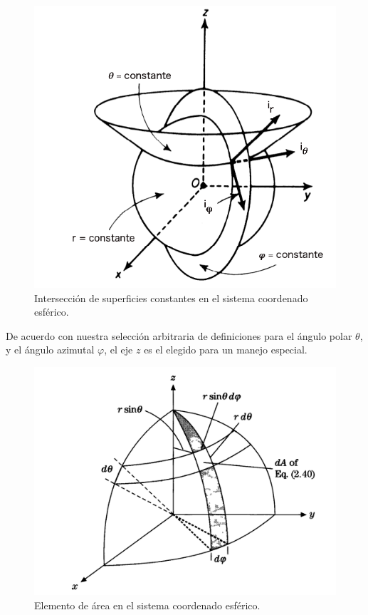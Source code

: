 \begin{figure}
    \centering
    \includegraphics[scale=0.5]{Imagenes/CoordenadasEsfericasSuperficiesConstantes.png}
    \caption{Intersección de superficies constantes en el sistema coordenado esférico.}
    \label{fig:figura_coordenadas_esfericas_superficies}
\end{figure}
De acuerdo con nuestra selección arbitraria de definiciones para el ángulo polar $\theta$, y el ángulo azimutal $\varphi$, el eje $z$ es el elegido para un manejo especial. \begin{figure}[H]
    \centering
    \includegraphics[scale=0.35]{Imagenes/Elemento_Area_Esferico}
    \caption{Elemento de área en el sistema coordenado esférico.}
    \label{fig:figura_elemento_area_esferico}
\end{figure}
